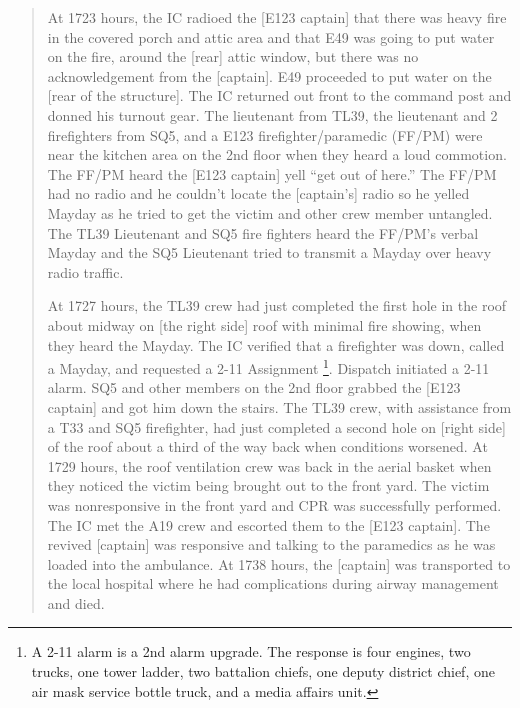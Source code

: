 \documentclass[11pt,oneside]{book}
\begin{document}
\begin{quote}
At 1723 hours, the IC radioed the [E123 captain] that there was heavy fire in the covered porch and attic area and that E49 was going to put water on the fire, around the [rear] attic window, but there was no acknowledgement from the [captain]. E49 proceeded to put water on the [rear of the structure]. The IC returned out front to the command post and donned his turnout gear. The lieutenant from TL39, the lieutenant and 2 firefighters from SQ5, and a E123 firefighter/paramedic (FF/PM) were near the kitchen area on the 2nd floor when they heard a loud commotion. The FF/PM heard the [E123 captain] yell ``get out of here.'' The FF/PM had no radio and he couldn't locate the [captain's] radio so he yelled Mayday as he tried to get the victim and other crew member untangled. The TL39 Lieutenant and SQ5 fire fighters heard the FF/PM's verbal Mayday and the SQ5 Lieutenant tried to transmit a Mayday over heavy radio traffic.

At 1727 hours, the TL39 crew had just completed the first hole in the roof about midway on [the right side] roof with minimal fire showing, when they heard the Mayday. The IC verified that a firefighter was down, called a Mayday, and requested a 2-11 Assignment \footnote{A 2-11 alarm is a 2nd alarm upgrade. The response is four engines, two trucks, one tower ladder, two battalion chiefs, one deputy district chief, one air mask service bottle truck, and a media affairs unit.}. Dispatch initiated a 2-11 alarm. SQ5 and other members on the 2nd floor grabbed the [E123 captain] and got him down the stairs. The TL39 crew, with assistance from a T33 and SQ5 firefighter, had just completed a second hole on [right side] of the roof about a third of the way back when conditions worsened. At 1729 hours, the roof ventilation crew was back in the aerial basket when they noticed the victim being brought out to the front yard. The victim was nonresponsive in the front yard and CPR was successfully performed. The IC met the A19 crew and escorted them to the [E123 captain]. The revived [captain] was responsive and talking to the paramedics as he was loaded into the ambulance. At 1738 hours, the [captain] was transported to the local hospital where he had complications during airway management and died.
\end{quote}
\end{document}
